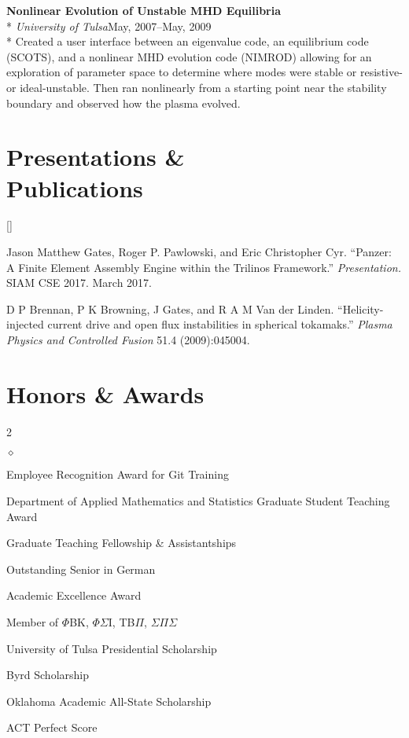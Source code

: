 \documentclass[margin,line,pifont,palatino,10pt]{res}
\begin{document}
\begin{resume}
{\bf Nonlinear Evolution of Unstable MHD Equilibria}\\*
{\it University of Tulsa}\hfill May, 2007--May, 2009\\*
Created a user interface between an eigenvalue code, an equilibrium code (SCOTS), and a nonlinear MHD evolution code (NIMROD) allowing for an exploration of parameter space to determine where modes were stable or resistive- or ideal-unstable.  Then ran nonlinearly from a starting point near the stability boundary and observed how the plasma evolved.

\pagebreak
\section{\sc Presentations \&\\Publications}
\setcounter{cnt}{1}
\begin{list}{[] }{\leftmargin=0.255in}
\item
Jason Matthew Gates, Roger P. Pawlowski, and Eric Christopher Cyr.  ``Panzer:  A Finite Element Assembly Engine within the Trilinos Framework.''  {\em Presentation.}  SIAM CSE 2017.  March 2017.
\item
D P Brennan, P K Browning, J Gates, and R A M Van der Linden. ``Helicity-injected current drive and open flux instabilities in spherical tokamaks.''  {\em Plasma Physics and Controlled Fusion} 51.4 (2009):045004.
\end{list}

\vspace{1.5mm}
\section{\sc Honors \& Awards}
\vspace{0ex}
\begin{multicols}{2}
\raggedright
\begin{list}{$\diamond$}{\leftmargin=0.15in}
\item Employee Recognition Award for Git Training
\item Department of Applied Mathematics and Statistics Graduate Student Teaching Award
\item Graduate Teaching Fellowship \& Assistantships
\item Outstanding Senior in German
\item Academic Excellence Award
\item Member of $\Phi$BK, $\Phi\Sigma$I, TB$\Pi$, $\Sigma\Pi\Sigma$
\item University of Tulsa Presidential Scholarship
\item Byrd Scholarship
\item Oklahoma Academic All-State Scholarship
\item ACT Perfect Score
\end{list}
\end{multicols}


\end{resume}
\end{document}
